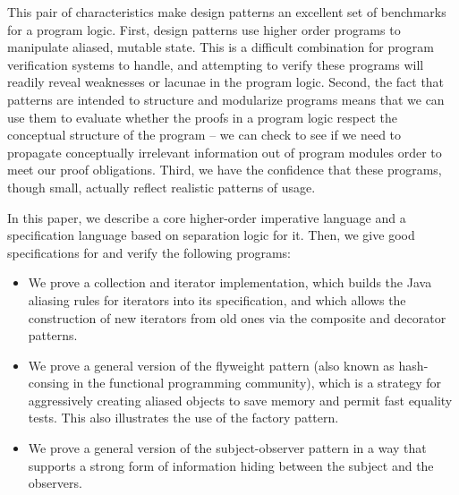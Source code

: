 \documentclass[preprint,natbib]{sigplanconf}
\begin{document}
This pair of characteristics make design patterns an excellent set of
benchmarks for a program logic.  First, design patterns use higher
order programs to manipulate aliased, mutable state. This is a
difficult combination for program verification systems to handle, and
attempting to verify these programs will readily reveal weaknesses or
lacunae in the program logic. Second, the fact that patterns are
intended to structure and modularize programs means that we can use
them to evaluate whether the proofs in a program logic respect the
conceptual structure of the program -- we can check to see if we need
to propagate conceptually irrelevant information out of program
modules order to meet our proof obligations. Third, we have the
confidence that these programs, though small, actually reflect
realistic patterns of usage.

In this paper, we describe a core higher-order imperative language and
a specification language based on separation logic for it. Then, we
give good specifications for and verify the following programs:

\begin{itemize}
\item We prove a collection and iterator implementation, which builds
  the Java aliasing rules for iterators into its specification, and
  which allows the construction of new iterators from old ones via the
  composite and decorator patterns.  

\item We prove a general version of the flyweight pattern (also known as
  hash-consing in the functional programming community), which is a
  strategy for aggressively creating aliased objects to save memory
  and permit fast equality tests. This also illustrates the use of the
  factory pattern.

\item We prove a general version of the subject-observer pattern in a
  way that supports a strong form of information hiding between the
  subject and the observers.
\end{itemize}
\end{document}
